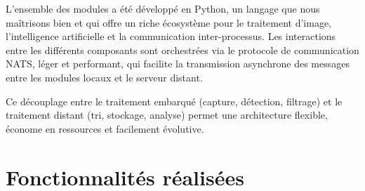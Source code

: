 \documentclass[a4paper,11pt]{article}
\begin{document}
	L’ensemble des modules a été développé en Python, un langage que nous maîtrisons bien et qui offre un riche écosystème pour le traitement d’image, l’intelligence artificielle et la communication inter-processus. Les interactions entre les différents composants sont orchestrées via le protocole de communication NATS, léger et performant, qui facilite la transmission asynchrone des messages entre les modules locaux et le serveur distant.
	
	Ce découplage entre le traitement embarqué (capture, détection, filtrage) et le traitement distant (tri, stockage, analyse) permet une architecture flexible, économe en ressources et facilement évolutive.



	
	\section{Fonctionnalités réalisées}
\end{document}
